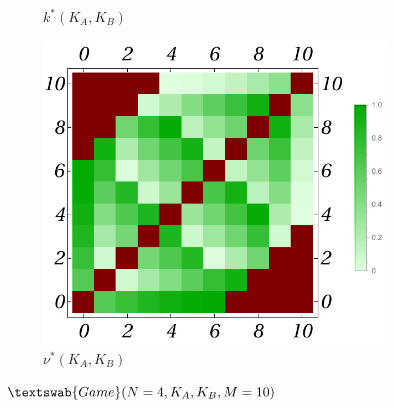 \documentclass{article}
\theoremstyle{definition}
\newcommand{\G}[1]{$\textswab{Game}(#1)$}
\begin{document}
\begin{figure}[H]
\begin{subfigure}[b]{0.3\textwidth}
        \caption{$k^*(K_A,K_B)$}
        \label{fig:sub2}
    \end{subfigure}
    \hfill %
    \begin{subfigure}[b]{0.3\textwidth}
        \includegraphics[width=\textwidth]{img/nu_Plot_4_10.pdf}
        \caption{$\nu^*(K_A,K_B)$}
        \label{fig:sub3}
    \end{subfigure}
    
    \caption{\G{N=4,K_A,K_B,M=10}}
    \label{fig:Game4__10_Pknu}
\end{figure}
\end{document}

